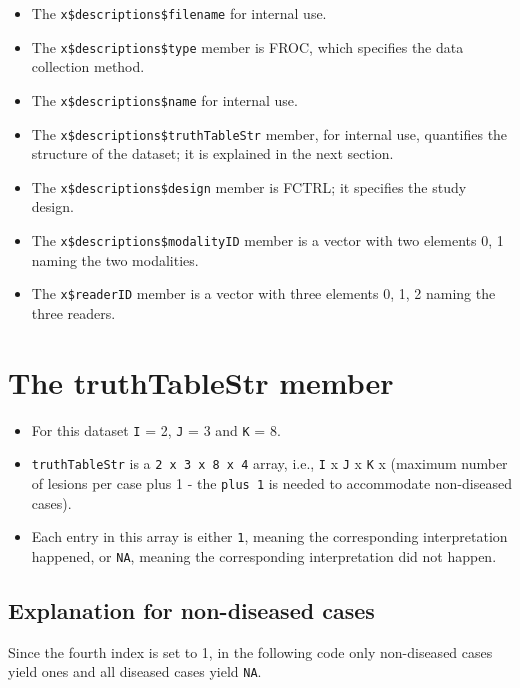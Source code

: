 \documentclass[
]{book}
\providecommand{\tightlist}{%
  \setlength{\itemsep}{0pt}\setlength{\parskip}{0pt}}
\begin{document}
\begin{itemize}
\tightlist
\item
  The \texttt{x\$descriptions\$filename} for internal use.
\item
  The \texttt{x\$descriptions\$type} member is FROC, which specifies the data collection method.
\item
  The \texttt{x\$descriptions\$name} for internal use.
\item
  The \texttt{x\$descriptions\$truthTableStr} member, for internal use, quantifies the structure of the dataset; it is explained in the next section.
\item
  The \texttt{x\$descriptions\$design} member is FCTRL; it specifies the study design.
\item
  The \texttt{x\$descriptions\$modalityID} member is a vector with two elements 0, 1 naming the two modalities.
\item
  The \texttt{x\$readerID} member is a vector with three elements 0, 1, 2 naming the three readers.
\end{itemize}

\hypertarget{dataset-object-truth-table-str}{%
\section{The truthTableStr member}\label{dataset-object-truth-table-str}}

\begin{itemize}
\tightlist
\item
  For this dataset \texttt{I} = 2, \texttt{J} = 3 and \texttt{K} = 8.
\item
  \texttt{truthTableStr} is a \texttt{2\ x\ 3\ x\ 8\ x\ 4} array, i.e., \texttt{I} x \texttt{J} x \texttt{K} x (maximum number of lesions per case plus 1 - the \texttt{plus\ 1} is needed to accommodate non-diseased cases).
\item
  Each entry in this array is either \texttt{1}, meaning the corresponding interpretation happened, or \texttt{NA}, meaning the corresponding interpretation did not happen.
\end{itemize}

\hypertarget{explanation-for-non-diseased-cases}{%
\subsection{Explanation for non-diseased cases}\label{explanation-for-non-diseased-cases}}

Since the fourth index is set to 1, in the following code only non-diseased cases yield ones and all diseased cases yield \texttt{NA}.
\end{document}
